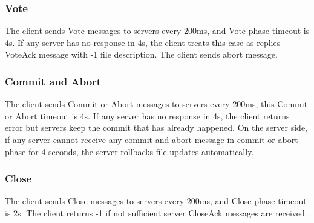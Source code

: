\documentclass[12pt,fleqn]{article}
\begin{document}
\subsubsection{Vote}
The client sends Vote messages to servers every 200ms, and Vote phase timeout is 4s. If any server has no response in 4s, the client treats this case as replies VoteAck message with -1 file description. The client sends abort message.

\subsubsection{Commit and Abort}
The client sends Commit or Abort messages to servers every 200ms, this Commit or Abort timeout is 4s. If any server has no response in 4s, the client returns error but servers keep the commit that has already happened. On the server side, if any server cannot receive any commit and abort message in commit or abort phase for 4 seconds, the server rollbacks file updates automatically.
 
 \subsubsection{Close}
The client sends Close messages to servers every 200ms, and Close phase timeout is 2s. The client returns -1 if not sufficient server CloseAck messages are received.
 
\end{document}
